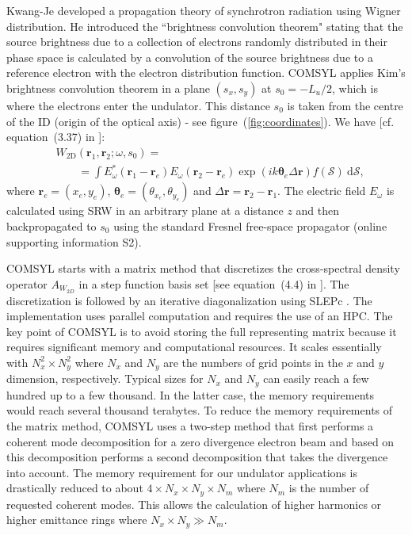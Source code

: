 \documentclass[preprint]{iucr}
\newcommand{\inred}[1]{{\color{red}#1}}
\begin{document}
Kwang-Je  developed a propagation theory of synchrotron radiation using Wigner distribution. He introduced the ``brightness convolution theorem" stating that the source brightness due to a collection of electrons randomly distributed in their phase space is calculated by a convolution of the source brightness due to a reference electron with the electron distribution function. 
COMSYL applies Kim's brightness convolution theorem in a plane $(s_x,s_y)$ at $s_0=-L_u\big/2$, which is where the electrons enter the undulator. This distance $s_0$ is taken from the \inred{centre} of the ID (origin of \inred{the} optical axis) - see figure~(\ref{fig:coordinates}). We have [cf. equation~(3.37) in \cite{glassThesis}]:
\begin{equation}\label{eq:comsyl_W2D}
\begin{split}
& W_\text{2D}(\textbf{r}_1,\textbf{r}_2;\omega,s_0) = \\
&\qquad=\int E_\omega^*(\textbf{r}_1-\textbf{r}_e)
    E_\omega(\textbf{r}_2-\textbf{r}_e) \exp(i k \mathbf{\theta}_e\Delta\textbf{r})f(\mathcal{S})~\text{d}\mathcal{S},
\end{split}
\end{equation}
where $\textbf{r}_e=(x_e,y_e)$, $\mathbf{\theta}_e=(\theta_{x_e},\theta_{y_e})$ and $\Delta\textbf{r}=\textbf{r}_2-\textbf{r}_1$. The electric field $E_\omega$ is calculated using SRW in an arbitrary plane at a distance $z$ and then backpropagated to $s_0$ using the standard Fresnel free-space propagator (\inred{online supporting information S2}).

COMSYL starts with a matrix method that discretizes the cross-spectral density operator $A_{W_{2D}}$ in a step function basis set [see equation~(4.4) in \cite{glassThesis}]. The discretization is followed by an iterative diagonalization using SLEPc \cite{SLEPc}. The implementation uses parallel computation and requires the use of an HPC. The key point of COMSYL is to avoid storing the full representing matrix because it requires significant memory and computational resources. It scales essentially with $N_x^2 \times N_y^2$ where $N_x$ and $N_y$ are the numbers of grid points in the $x$ and $y$ dimension, respectively. Typical sizes for $N_x$ and $N_y$ can easily reach a few hundred up to a few thousand. In the latter case\inred{,} the memory requirements would reach several thousand terabytes. To reduce the memory requirements of the matrix method, COMSYL uses a two-step method that first performs a coherent mode decomposition for a zero divergence electron beam and based on this decomposition performs a second decomposition that takes the divergence into account. The memory requirement for our undulator applications is drastically reduced to about $4 \times N_x \times N_y \times N_m$ where $N_m$ is the number of requested coherent modes. This allows the calculation of higher harmonics or higher emittance rings where $N_x \times N_y \gg N_m$. 
\end{document}
